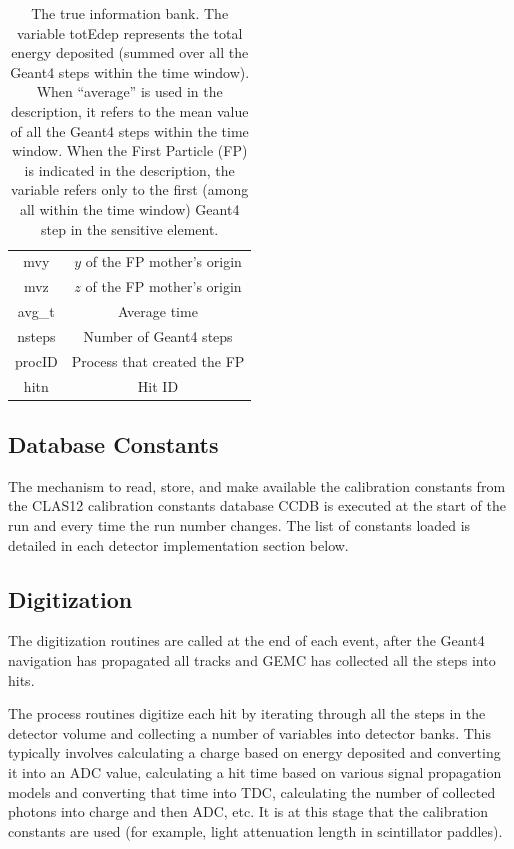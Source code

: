 \begin{table}[h]
\begin{center}
\begin{tabular}{| c | c |}
				mvy         &   $y$  of the FP mother's origin \\
				mvz         &   $z$  of the FP mother's origin \\
				avg\_t      &   Average time \\
				nsteps      &   Number of Geant4 steps \\
				procID      &   Process that created the FP  \\
				hitn        &   Hit ID \\
			\hline \hline
		\end{tabular}
	\end{center}
	\caption{The true information bank. The variable totEdep represents the total energy deposited (summed over all
             the Geant4 steps within the time window). When ``average'' is used in the description, it refers to
             the mean value of all the Geant4 steps within the time window.
             When the First Particle (FP) is indicated in the description, the variable refers only to the
             first (among all within the time window) Geant4 step in the sensitive element.
}\label{tab:trueInformation}
\end{table}


\subsection{Database Constants}

The mechanism to read, store, and make available the calibration constants from the CLAS12
calibration constants database CCDB \cite{ccdb} is
executed at the start of the run and every time the run number changes.
The list of constants loaded is detailed in each detector implementation section below.

\subsection{Digitization}

The digitization routines are called at the end of each event, after the Geant4 navigation
has propagated all tracks and GEMC has collected all the steps into hits.

The process routines digitize each hit by iterating through all the steps in the detector volume and collecting
a number of variables into detector banks. This typically involves calculating a charge based
on energy deposited and converting it into an ADC value, calculating a hit time based
on various signal propagation models and converting that time into TDC, calculating the number
of collected photons into charge and then ADC, etc. It is at this stage that the calibration
constants are used (for example, light attenuation length in scintillator paddles).

